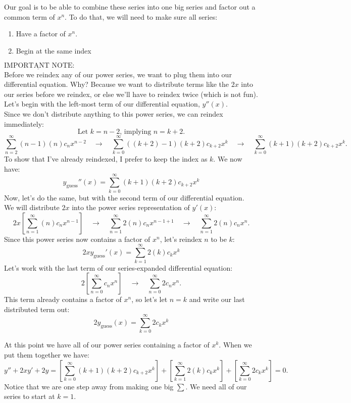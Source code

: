 \documentclass[a4paper,12pt]{article}
\begin{document}
Our goal is to be able to combine these series into one big series and factor out a common term of $x^n$. To do that, we will need to make sure all series:

\begin{enumerate}
	\item Have a factor of $x^n$.
	\item Begin at the same index
\end{enumerate}

$\boxed{\underline{\text{IMPORTANT NOTE}}}:$\\

 Before we reindex any of our power series, we want to plug them into our differential equation. Why? Because we want to distribute terms like the $2x$ into our series before we reindex, or else we'll have to reindex twice (which is not fun).\\
 
 Let's begin with the left-most term of our differential equation, $y''(x)$.\\
 
Since we don't distribute anything to this power series, we can reindex immediately:
$$ \text{Let }k = n-2 \text{, implying } n = k+2. $$
$$ \sum_{n=2}^{\infty} (n-1)(n)c_nx^{n-2} \quad\rightarrow\quad \sum_{k=0}^{\infty} ((k+2)-1)(k+2)c_{k+2}x^{k} \quad\rightarrow\quad \sum_{k=0}^{\infty} (k+1)(k+2)c_{k+2}x^{k}.$$
To show that I've already reindexed, I prefer to keep the index as $k$. We now have:
$$ y_{\text{guess}}''(x) = \sum_{k=0}^{\infty} (k+1)(k+2)c_{k+2}x^{k} $$
Now, let's do the same, but with the second term of our differential equation.\\
 
 We will distribute $2x$ into the power series representation of $y'(x)$:
 $$ 2x\left[\sum_{n=1}^{\infty} (n)c_nx^{n-1}\right] \quad\rightarrow\quad \sum_{n=1}^{\infty} 2(n)c_nx^{n-1 + 1} \quad\rightarrow\quad \sum_{n=1}^{\infty} 2(n)c_nx^{n}. $$
 Since this power series now contains a factor of $x^n$, let's reindex $n$ to be $k$:
 $$ 2xy_{\text{guess}}'(x) = \sum_{k=1}^{\infty} 2(k)c_kx^{k}$$ 
 Let's work with the last term of our series-expanded differential equation:
 $$ 2\left[\sum_{n=0}^{\infty} c_nx^n\right] \quad\rightarrow\quad \sum_{n=0}^{\infty} 2c_nx^n. $$ 
 This term already contains a factor of $x^n$, so let's let $n = k$ and write our last distributed term out:
 $$ 2y_{\text{guess}}(x) =  \sum_{k=0}^{\infty} 2c_kx^k $$
 
 At this point we have all of our power series containing a factor of $x^k$. When we put them together we have:
 $$ y'' + 2xy' + 2y = \left[\sum_{k=0}^{\infty} (k+1)(k+2)c_{k+2}x^{k}\right] + \left[\sum_{k=1}^{\infty} 2(k)c_kx^{k}\right] + \left[\sum_{k=0}^{\infty} 2c_kx^k\right] = 0.  $$
 Notice that we are one step away from making one big $\sum$. We need all of our series to start at $k=1$.\\
 
\end{document}
